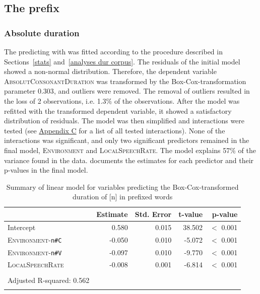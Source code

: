 \subsection{The prefix } \label{un corpus}

\subsubsection{Absolute duration}

The  predicting  with  was fitted according to the procedure described in Sections~\ref{stats} and~\ref{analyses dur corpus}. 
The residuals of the initial model showed a non-normal distribution. Therefore, the dependent variable \textsc{AbsolutConsonantDuration} was transformed by the Box-Cox-transformation parameter $0.303$, and outliers were removed. The removal of outliers resulted in the loss of  2 observations, i.e. 1.3\% of the observations. After the model was refitted with the transformed dependent variable, it showed a satisfactory distribution of residuals. The model was then simplified and interactions were tested  (see \hyperref[Appendix C: Summaries of tested interactions in corpus study]{Appendix C} for a list of all tested interactions).
None of the interactions was significant, and only two significant predictors remained in the final model, \textsc{Environment} and  \textsc{LocalSpeechRate}. The model explains 57\% of the variance found in the data.  documents the estimates for each predictor and their p-values in the final model.

\begin{table}[!h]
	\caption{Summary of linear model for variables predicting the Box-Cox-transformed duration of [n] in prefixed words}
	\label{tbl: summary model un}
	
		
		
		\begin{tabular}{lrrrr}
			
			
			\lsptoprule
			& Estimate & Std. Error & t-value & p-value  \\ 
			\midrule
			Intercept                           &   0.580 &  0.015  & 38.502 &  $<$ 0.001\\
			\textsc{Environment}-\texttt{n\#C} & -0.050 &  0.010 & -5.072 & $<$ 0.001\\
			\textsc{Environment}-\texttt{n\#V} & -0.097 &   0.010 & -9.770 & $<$ 0.001\\
			\textsc{LocalSpeechRate} &                 -0.008  & 0.001 &  -6.814 & $<$ 0.001\\
			
			\midrule\\
			Adjusted R-squared: 0.562  \\
			\lspbottomrule
		\end{tabular}

	
\end{table}


